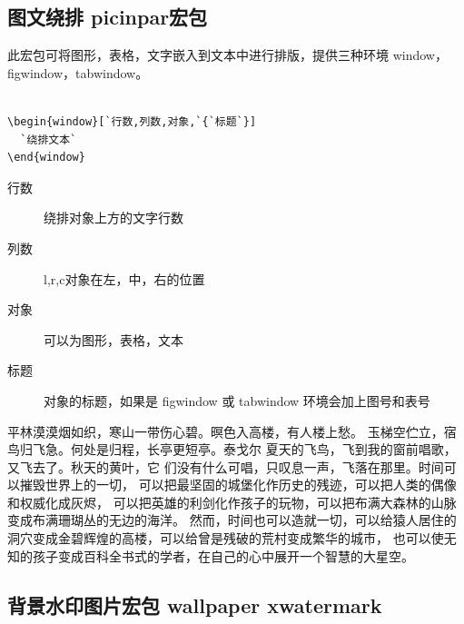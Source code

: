 \clearpage



\subsection{图文绕排 picinpar宏包}
此宏包可将图形，表格，文字嵌入到文本中进行排版，提供三种环境 window，figwindow，tabwindow。


\begin{lstlisting}[language={[LaTeX]TeX}]

\begin{window}[`行数,列数,对象,`{`标题`}]
  `绕排文本`
\end{window}
\end{lstlisting}
\begin{description}
  \item[行数] 绕排对象上方的文字行数
  \item[列数] l,r,c对象在左，中，右的位置
  \item[对象] 可以为图形，表格，文本
  \item[标题] 对象的标题，如果是 figwindow 或 tabwindow 环境会加上图号和表号
\end{description}


\begin{figwindow}
平林漠漠烟如织，寒山一带伤心碧。暝色入高楼，有人楼上愁。
玉梯空伫立，宿鸟归飞急。何处是归程，长亭更短亭。泰戈尔
夏天的飞鸟，飞到我的窗前唱歌，又飞去了。秋天的黄叶，它
们没有什么可唱，只叹息一声，飞落在那里。时间可以摧毁世界上的一切，
可以把最坚固的城堡化作历史的残迹，可以把人类的偶像和权威化成灰烬，
可以把英雄的利剑化作孩子的玩物，可以把布满大森林的山脉变成布满珊瑚丛的无边的海洋。
然而，时间也可以造就一切，可以给猿人居住的洞穴变成金碧辉煌的高楼，可以给曾是残破的荒村变成繁华的城市，
也可以使无知的孩子变成百科全书式的学者，在自己的心中展开一个智慧的大星空。
\end{figwindow}



\subsection{背景水印图片宏包 wallpaper xwatermark}

